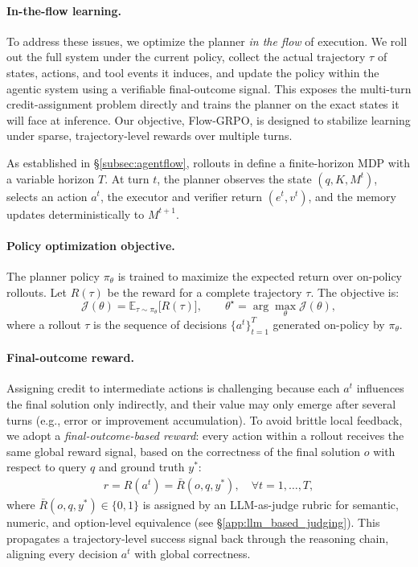 \paragraph{In-the-flow learning.}
To address these issues, we optimize the planner \emph{in the flow} of execution. We roll out the full \model system under the current policy, collect the actual trajectory $\tau$ of states, actions, and tool events it induces, and update the policy within the agentic system using a verifiable final-outcome signal. This exposes the multi-turn credit-assignment problem directly and trains the planner on the exact states it will face at inference. Our objective, Flow-GRPO, is designed to stabilize learning under sparse, trajectory-level rewards over multiple turns.

As established in \S\ref{subsec:agentflow}, rollouts in \model define a finite-horizon MDP with a variable horizon $T$. At turn $t$, the planner observes the state $(q, K, M^t)$, selects an action $a^t$, the executor and verifier return $(e^t, v^t)$, and the memory updates deterministically to $M^{t+1}$.

\paragraph{Policy optimization objective.}
The planner policy $\pi_\theta$ is trained to maximize the expected return over on-policy rollouts. Let $R(\tau)$ be the reward for a complete trajectory $\tau$. The objective is:
\begin{equation}
    \mathcal{J}(\theta)=\mathbb{E}_{\tau\sim\pi_\theta}\!\big[R(\tau)\big], \qquad \theta^\star=\arg\max_\theta \mathcal{J}(\theta),
\end{equation}
where a rollout $\tau$ is the sequence of decisions $\{a^t\}_{t=1}^{T}$  generated on-policy by $\pi_\theta$.


\paragraph{Final-outcome reward.}
Assigning credit to intermediate actions is challenging because each $a^t$ influences the final solution only indirectly, and their value may only emerge after several turns (e.g., error or improvement accumulation). To avoid brittle local feedback, we adopt a \emph{final-outcome-based reward}: every action within a rollout receives the same global reward signal, based on the correctness of the final solution $o$ with respect to query $q$ and ground truth $y^*$:
\begin{align}
    r = R(a^t) = \bar{R}(o, q, y^*), \quad \forall t = 1,\dots,T,
    \label{eq:reward_func}
\end{align}
where $\bar{R}(o, q, y^*) \in \{0, 1\}$ is assigned by an LLM-as-judge rubric for semantic, numeric, and option-level equivalence (see \S\ref{app:llm_based_judging}). This propagates a trajectory-level success signal back through the reasoning chain, aligning every decision $a^t$ with global correctness.

